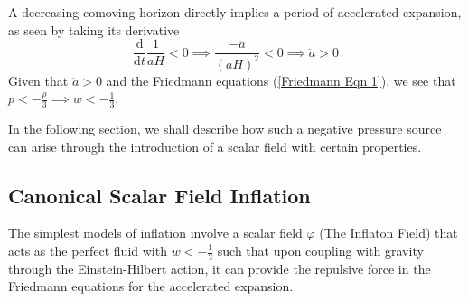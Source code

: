 \documentclass[aps,prd,reprint,preprintnumbers,showpacs,floatfix,nofootinbib,superscript address]{revtex4-2}
\begin{document}
A decreasing comoving horizon directly implies a period of accelerated expansion, as seen by taking its derivative
\begin{equation}
    \frac{\mathrm{d}}{\mathrm{d}t} \frac{1}{aH} <  0 \implies \frac{-\ddot{a}}{(aH)^2} < 0 \implies \ddot{a} > 0
\end{equation}
Given that $\ddot{a} > 0$ and the Friedmann equations (\ref{Friedmann Eqn 1}), we see that $p < -\frac{\rho}{3} \implies w < - \frac{1}{3}$. 

In the following section, we shall describe how such a negative pressure source can arise through the introduction of a scalar field with certain properties.

\subsection{Canonical Scalar Field Inflation} \label{Canonical Scalar Field Inflation}
The simplest models of inflation involve a scalar field $\varphi$ (The Inflaton Field) that acts as the perfect fluid with $w < -\frac{1}{3}$ such that upon coupling with gravity through the Einstein-Hilbert action, it can provide the repulsive force in the Friedmann equations for the accelerated expansion.
\end{document}
